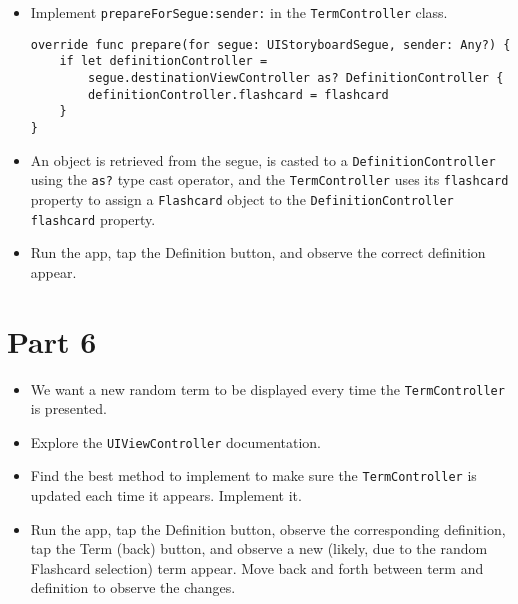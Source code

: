 \documentclass[a4paper,11pt]{scrartcl}
\begin{document}
\begin{itemize}
\item Implement \texttt{prepareForSegue:sender:} in the \texttt{TermController} class.
\begin{lstlisting}
override func prepare(for segue: UIStoryboardSegue, sender: Any?) {
	if let definitionController =
		segue.destinationViewController as? DefinitionController {
		definitionController.flashcard = flashcard
	}
}
\end{lstlisting}
\item An object is retrieved from the segue, is casted to a \texttt{DefinitionController} using the \texttt{as?} type cast operator, and the \texttt{TermController} uses its \texttt{flashcard} property to assign a \texttt{Flashcard} object to the \texttt{DefinitionController} \texttt{flashcard} property.
\item Run the app, tap the Definition button, and observe the correct definition appear.
\end{itemize}

\section*{Part 6}

\begin{itemize}
\item We want a new random term to be displayed every time the \texttt{TermController} is presented.
\item Explore the \texttt{UIViewController} documentation.
\item Find the best method to implement to make sure the \texttt{TermController} is updated each time it appears. Implement it.
\item Run the app, tap the Definition button, observe the corresponding definition, tap the Term (back) button, and observe a new (likely, due to the random Flashcard selection) term appear. Move back and forth between term and definition to observe the changes.
\end{itemize}
\end{document}
